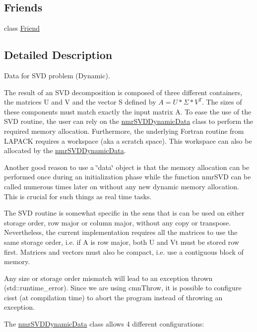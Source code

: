 \subsection*{Friends}
\begin{DoxyCompactItemize}
\item 
class \hyperlink{classnmr_s_v_d_dynamic_data_a7f8321d57e81bc613d5dbef3410ba70e}{Friend}
\end{DoxyCompactItemize}


\subsection{Detailed Description}
Data for S\+V\+D problem (Dynamic). 

The result of an S\+V\+D decomposition is composed of three different containers, the matrices U and V and the vector S defined by $ A = U * \Sigma * V^{T} $. The sizes of these components must match exactly the input matrix A. To ease the use of the S\+V\+D routine, the user can rely on the \hyperlink{classnmr_s_v_d_dynamic_data}{nmr\+S\+V\+D\+Dynamic\+Data} class to perform the required memory allocation. Furthermore, the underlying Fortran routine from L\+A\+P\+A\+C\+K requires a workspace (aka a scratch space). This workspace can also be allocated by the \hyperlink{classnmr_s_v_d_dynamic_data}{nmr\+S\+V\+D\+Dynamic\+Data}.

Another good reason to use a \char`\"{}data\char`\"{} object is that the memory allocation can be performed once during an initialization phase while the function nmr\+S\+V\+D can be called numerous times later on without any new dynamic memory allocation. This is crucial for such things as real time tasks.

The S\+V\+D routine is somewhat specific in the sens that is can be used on either storage order, row major or column major, without any copy or transpose. Nevertheless, the current implementation requires all the matrices to use the same storage order, i.\+e. if A is row major, both U and Vt must be stored row first. Matrices and vectors must also be compact, i.\+e. use a contiguous block of memory.

Any size or storage order mismatch will lead to an exception thrown (std\+::runtime\+\_\+error). Since we are using cmn\+Throw, it is possible to configure cisst (at compilation time) to abort the program instead of throwing an exception.

The \hyperlink{classnmr_s_v_d_dynamic_data}{nmr\+S\+V\+D\+Dynamic\+Data} class allows 4 different configurations\+:


